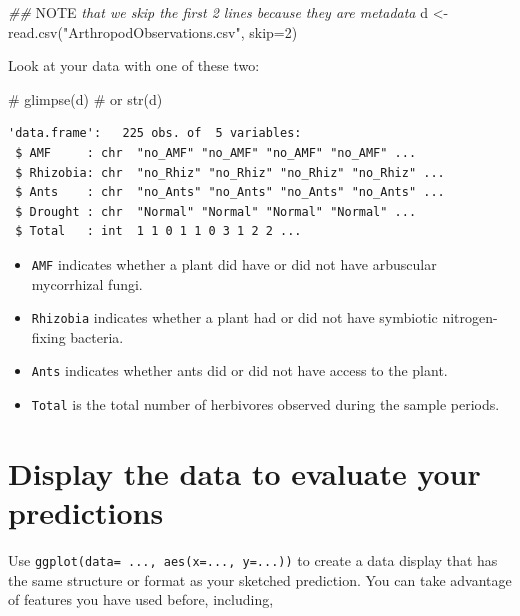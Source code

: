 \documentclass[
  letterpaper,
  DIV=11,
  numbers=noendperiod]{scrreprt}
\newenvironment{Shaded}{\begin{snugshade}}{\end{snugshade}}
\newcommand{\AlertTok}[1]{\textcolor[rgb]{0.68,0.00,0.00}{#1}}
\newcommand{\AttributeTok}[1]{\textcolor[rgb]{0.40,0.45,0.13}{#1}}
\newcommand{\CommentTok}[1]{\textcolor[rgb]{0.37,0.37,0.37}{#1}}
\newcommand{\DecValTok}[1]{\textcolor[rgb]{0.68,0.00,0.00}{#1}}
\newcommand{\DocumentationTok}[1]{\textcolor[rgb]{0.37,0.37,0.37}{\textit{#1}}}
\newcommand{\FunctionTok}[1]{\textcolor[rgb]{0.28,0.35,0.67}{#1}}
\newcommand{\NormalTok}[1]{\textcolor[rgb]{0.00,0.23,0.31}{#1}}
\newcommand{\OtherTok}[1]{\textcolor[rgb]{0.00,0.23,0.31}{#1}}
\newcommand{\StringTok}[1]{\textcolor[rgb]{0.13,0.47,0.30}{#1}}
\providecommand{\tightlist}{%
  \setlength{\itemsep}{0pt}\setlength{\parskip}{0pt}}
\begin{document}
\begin{Shaded}
\begin{Highlighting}[]
\DocumentationTok{\#\# }\AlertTok{NOTE}\DocumentationTok{ that we skip the first 2 lines because they are metadata}
\NormalTok{d }\OtherTok{\textless{}{-}} \FunctionTok{read.csv}\NormalTok{(}\StringTok{"ArthropodObservations.csv"}\NormalTok{,}
              \AttributeTok{skip=}\DecValTok{2}\NormalTok{)}
\end{Highlighting}
\end{Shaded}

Look at your data with one of these two:

\begin{Shaded}
\begin{Highlighting}[]
\CommentTok{\# glimpse(d)}
\CommentTok{\# or }
\FunctionTok{str}\NormalTok{(d)}
\end{Highlighting}
\end{Shaded}

\begin{verbatim}
'data.frame':   225 obs. of  5 variables:
 $ AMF     : chr  "no_AMF" "no_AMF" "no_AMF" "no_AMF" ...
 $ Rhizobia: chr  "no_Rhiz" "no_Rhiz" "no_Rhiz" "no_Rhiz" ...
 $ Ants    : chr  "no_Ants" "no_Ants" "no_Ants" "no_Ants" ...
 $ Drought : chr  "Normal" "Normal" "Normal" "Normal" ...
 $ Total   : int  1 1 0 1 1 0 3 1 2 2 ...
\end{verbatim}

\begin{itemize}
\tightlist
\item
  \texttt{AMF} indicates whether a plant did have or did not have
  arbuscular mycorrhizal fungi.
\item
  \texttt{Rhizobia} indicates whether a plant had or did not have
  symbiotic nitrogen-fixing bacteria.
\item
  \texttt{Ants} indicates whether ants did or did not have access to the
  plant.
\item
  \texttt{Total} is the total number of herbivores observed during the
  sample periods.
\end{itemize}

\section{Display the data to evaluate your
predictions}\label{display-the-data-to-evaluate-your-predictions}

Use \texttt{ggplot(data=\ ...,\ aes(x=...,\ y=...))} to create a data
display that has the same structure or format as your sketched
prediction. You can take advantage of features you have used before,
including,
\end{document}
